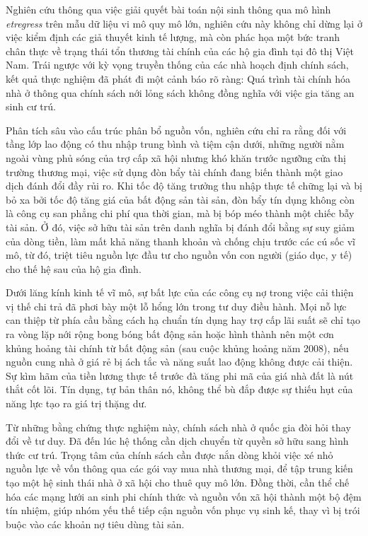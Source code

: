 \documentclass[12pt,a4paper]{report}
\begin{document}
Nghiên cứu thông qua việc giải quyết bài toán nội sinh thông qua mô hình \textit{etregress} trên mẫu dữ liệu vi mô quy mô lớn, nghiên cứu này không chỉ dừng lại ở việc kiểm định các giả thuyết kinh tế lượng, mà còn phác họa một bức tranh chân thực về trạng thái tổn thương tài chính của các hộ gia đình tại đô thị Việt Nam. Trái ngược với kỳ vọng truyền thống của các nhà hoạch định chính sách, kết quả thực nghiệm đã phát đi một cảnh báo rõ ràng: Quá trình tài chính hóa nhà ở thông qua chính sách nới lỏng sách không đồng nghĩa với việc gia tăng an sinh cư trú.

Phân tích sâu vào cấu trúc phân bổ nguồn vốn, nghiên cứu chỉ ra rằng đối với tầng lớp lao động có thu nhập trung bình và tiệm cận dưới, những người nằm ngoài vùng phủ sóng của trợ cấp xã hội nhưng khó khăn trước ngưỡng cửa thị trường thương mại, việc sử dụng đòn bẩy tài chính đang biến thành một giao dịch đánh đổi đầy rủi ro. Khi tốc độ tăng trưởng thu nhập thực tế chững lại và bị bỏ xa bởi tốc độ tăng giá của bất động sản tài sản, đòn bẩy tín dụng không còn là công cụ san phẳng chi phí qua thời gian, mà bị bóp méo thành một chiếc bẫy tài sản. Ở đó, việc sở hữu tài sản trên danh nghĩa bị đánh đổi bằng sự suy giảm của dòng tiền, làm mất khả năng thanh khoản và chống chịu trước các cú sốc vĩ mô, từ đó, triệt tiêu nguồn lực đầu tư cho nguồn vốn con người (giáo dục, y tế) cho thế hệ sau của hộ gia đình.

Dưới lăng kính kinh tế vĩ mô, sự bất lực của các công cụ nợ trong việc cải thiện vị thế chi trả đã phơi bày một lỗ hổng lớn trong tư duy điều hành. Mọi nỗ lực can thiệp từ phía cầu bằng cách hạ chuẩn tín dụng hay trợ cấp lãi suất sẽ chỉ tạo ra vòng lặp nới rộng bong bóng bất động sản hoặc hình thành nên một cơn khủng hoảng tài chính từ bất động sản (sau cuộc khủng hoảng năm 2008), nếu nguồn cung nhà ở giá rẻ bị ách tắc và năng suất lao động không được cải thiện. Sự kìm hãm của tiền lương thực tế trước đà tăng phi mã của giá nhà đất là nút thắt cốt lõi. Tín dụng, tự bản thân nó, không thể bù đắp được sự thiếu hụt của năng lực tạo ra giá trị thặng dư.

Từ những bằng chứng thực nghiệm này, chính sách nhà ở quốc gia đòi hỏi thay đổi về tư duy. Đã đến lúc hệ thống cần dịch chuyển từ quyền sở hữu sang hình thức cư trú. Trọng tâm của chính sách cần được nắn dòng khỏi việc xé nhỏ nguồn lực về vốn thông qua các gói vay mua nhà thương mại, để tập trung kiến tạo một hệ sinh thái nhà ở xã hội cho thuê quy mô lớn. Đồng thời, cần thể chế hóa các mạng lưới an sinh phi chính thức và nguồn vốn xã hội thành một bộ đệm tín nhiệm, giúp nhóm yếu thế tiếp cận nguồn vốn phục vụ sinh kế, thay vì bị trói buộc vào các khoản nợ tiêu dùng tài sản.
\end{document}
